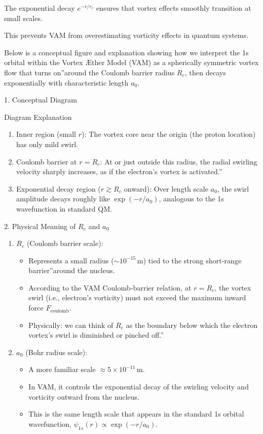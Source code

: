 \documentclass[a4paper,10pt]{article}
\begin{document}
The exponential decay $e^{-r/r_c}$ ensures that vortex effects smoothly transition at small scales.

This prevents VAM from overestimating vorticity effects in quantum systems.

Below is a conceptual figure and explanation showing how we interpret the 1s orbital within the Vortex Æther Model (VAM) as a spherically symmetric vortex flow that \grqq turns on\textquotedblright around the Coulomb barrier radius \(R_c\), then decays exponentially with characteristic length \(a_0\).





1. Conceptual Diagram

Diagram Explanation

\begin{enumerate}
    \item Inner region (small \(r\)): The vortex core near the origin (the proton location) has only mild swirl.
    \item Coulomb barrier at \(r = R_c\): At or just outside this radius, the radial swirling velocity sharply increases, as if the electron's vortex is \grqq activated.\textquotedblright
    \item Exponential decay region (\(r \gtrsim R_c\) onward): Over length scale \(a_0\), the swirl amplitude decays roughly like \(\exp(-r/a_0)\), analogous to the 1s wavefunction in standard QM.
\end{enumerate}

2. Physical Meaning of \(R_c\) and \(a_0\)

\begin{enumerate}
\item \(R_c\) (Coulomb barrier scale):

    \begin{itemize}
    \item Represents a small radius (\(\sim 10^{-15}\,\mathrm{m}\)) tied to the strong short‐range \grqq barrier\textquotedblright around the nucleus.
    \item According to the VAM Coulomb‐barrier relation, at \(r = R_c\), the vortex swirl (i.e., electron's vorticity) must not exceed the maximum inward force \(F_{\mathrm{coulomb}}\).
    \item Physically: we can think of \(R_c\) as the boundary below which the electron vortex's swirl is diminished or \grqq pinched off.\textquotedblright
    \end{itemize}

\item \(a_0\) (Bohr radius scale):

    \begin{itemize}
    \item A more familiar scale \(\approx 5 \times 10^{-11}\,\mathrm{m}\).
    \item In VAM, it controls the exponential decay of the swirling velocity and vorticity outward from the nucleus.
    \item This is the same length scale that appears in the standard 1s orbital wavefunction, \(\psi_{1s}(r) \propto \exp(-r/a_0)\).
    \end{itemize}
\end{enumerate}
\end{document}
